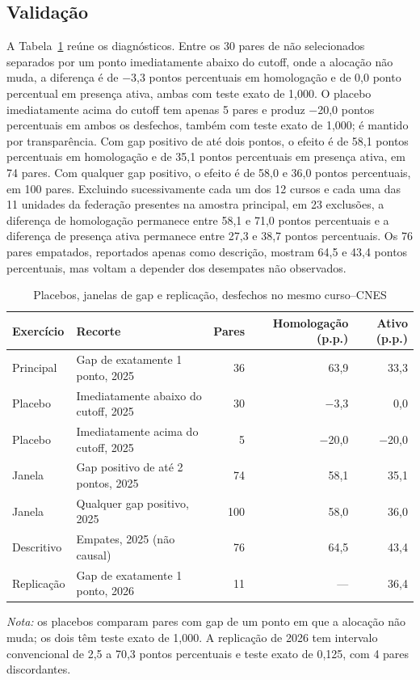 \documentclass[11pt,a4paper]{article}
\begin{document}
\subsection{Validação}

A Tabela~\ref{tab:validacao} reúne os diagnósticos. Entre os 30 pares de não
selecionados separados por um ponto imediatamente abaixo do cutoff, onde a
alocação não muda, a diferença é de $-$3,3 pontos percentuais em homologação e
de 0,0 ponto percentual em presença ativa, ambas com teste exato de 1,000. O
placebo imediatamente acima do cutoff tem apenas 5 pares e produz $-$20,0
pontos percentuais em ambos os desfechos, também com teste exato de 1,000; é
mantido por transparência. Com gap positivo de até dois pontos, o efeito é de
58,1 pontos percentuais em homologação e de 35,1 pontos percentuais em presença
ativa, em 74 pares. Com qualquer gap positivo, o efeito é de 58,0 e 36,0 pontos
percentuais, em 100 pares. Excluindo sucessivamente cada um dos 12 cursos e
cada uma das 11 unidades da federação presentes na amostra principal, em 23
exclusões, a diferença de homologação permanece entre 58,1 e 71,0 pontos
percentuais e a diferença de presença ativa permanece entre 27,3 e 38,7 pontos
percentuais. Os 76 pares empatados, reportados apenas como descrição, mostram
64,5 e 43,4 pontos percentuais, mas voltam a depender dos desempates não
observados.

\begin{table}[htbp]
\centering
\small
\caption{Placebos, janelas de gap e replicação, desfechos no mesmo curso--CNES}
\label{tab:validacao}
\begin{tabular}{llrrr}
\toprule
Exercício & Recorte & Pares & Homologação (p.p.) & Ativo (p.p.) \\
\midrule
Principal & Gap de exatamente 1 ponto, 2025 & 36 & 63,9 & 33,3 \\
Placebo & Imediatamente abaixo do cutoff, 2025 & 30 & $-$3,3 & 0,0 \\
Placebo & Imediatamente acima do cutoff, 2025 & 5 & $-$20,0 & $-$20,0 \\
Janela & Gap positivo de até 2 pontos, 2025 & 74 & 58,1 & 35,1 \\
Janela & Qualquer gap positivo, 2025 & 100 & 58,0 & 36,0 \\
Descritivo & Empates, 2025 (não causal) & 76 & 64,5 & 43,4 \\
Replicação & Gap de exatamente 1 ponto, 2026 & 11 & --- & 36,4 \\
\bottomrule
\end{tabular}

\vspace{2pt}
\begin{minipage}{0.9\textwidth}
\footnotesize \textit{Nota:} os placebos comparam pares com gap de um ponto em
que a alocação não muda; os dois têm teste exato de 1,000. A replicação de 2026
tem intervalo convencional de 2,5 a 70,3 pontos percentuais e teste exato de
0,125, com 4 pares discordantes.
\end{minipage}
\end{table}
\end{document}
